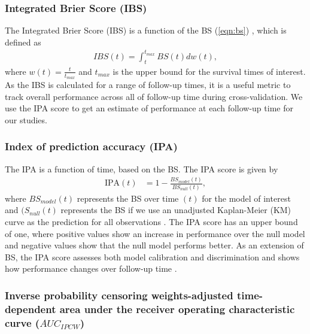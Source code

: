 \documentclass[preprint,12pt,authoryear]{elsarticle}
\begin{document}
\hypertarget{integrated-brier-score-ibs}{%
\subsubsection{Integrated Brier Score (IBS)}\label{integrated-brier-score-ibs}}

The Integrated Brier Score (IBS) is a function of the BS (\ref{eqn:bs}) \citep{graf1999}, which is defined as \begin{align*}
IBS(t)=\int_{t}^{t_{max}}BS(t)dw(t),
\end{align*} where $w(t)=\frac{t}{t_{max}}$ and $t_{max}$ is the upper bound for the survival times of interest. As the IBS is calculated for a range of follow-up times, it is a useful metric to track overall performance across all of follow-up time during cross-validation. We use the IPA score to get an estimate of performance at each follow-up time for our studies.

\hypertarget{index-of-prediction-accuracy-ipa}{%
\subsubsection{Index of prediction accuracy (IPA)}\label{index-of-prediction-accuracy-ipa}}

The IPA is a function of time, based on the BS. The IPA score is given by \begin{align}
\textrm{IPA}(t) &= 1-\frac{BS_{model}(t)}{BS_{null}(t)}, \nonumber
\end{align} where $BS_{model}(t)$ represents the BS over time $(t)$ for the model of interest and $(S_{null}(t)$ represents the BS if we use an unadjusted Kaplan-Meier (KM) curve as the prediction for all observations \citep{kattan2018index}. The IPA score has an upper bound of one, where positive values show an increase in performance over the null model and negative values show that the null model performs better. As an extension of BS, the IPA score assesses both model calibration and discrimination and shows how performance changes over follow-up time \citep{graf1999} \citep{kattan2018index}.




\hypertarget{auc2}{%
\subsubsection{Inverse probability censoring weights-adjusted time-dependent area under the receiver operating characteristic curve (\texorpdfstring{$AUC_{IPCW}$}{AUC\_IPCW})}\label{auc2}}
\end{document}
